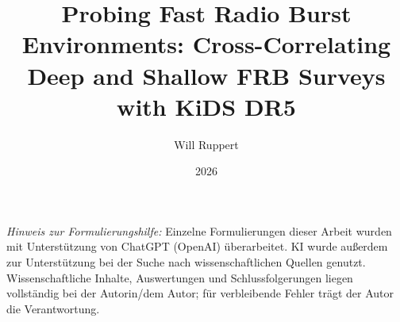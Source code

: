 \documentclass[
  DIV= 14,      %
  12pt,         %
  tucolor,       %
  BCOR=12mm,     %
  parskip=half,  %
  open=any,      %
  cleardoublepage=plain,  %
]{tudothesis}
\author{Will Ruppert}
\title{Probing Fast Radio Burst Environments: Cross-Correlating Deep and Shallow FRB Surveys with KiDS DR5\vspace{\titlepagetitletoauthor}}
\date{\vspace{\titlepagebirthplacetoyear}2026}
\begin{document}
\frontmatter

\maketitle

\makecorrectorpage


\tableofcontents

\mainmatter






\appendix


\backmatter
\printbibliography

\bigskip
\pagebreak
{\fontsize{12.5pt}{14.5pt}\selectfont\noindent\textit{Hinweis zur Formulierungshilfe:}} Einzelne 
Formulierungen dieser Arbeit wurden mit Unterstützung von ChatGPT (OpenAI) überarbeitet. 
KI wurde außerdem zur Unterstützung bei der Suche nach wissenschaftlichen Quellen genutzt.
Wissenschaftliche Inhalte, Auswertungen und Schlussfolgerungen liegen vollständig bei der 
Autorin/dem Autor; für verbleibende Fehler trägt der Autor die Verantwortung.


\cleardoublepage

\end{document}
